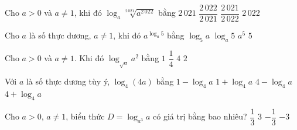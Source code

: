 

\begin{ex}%
	 Cho $a>0$ và $a\ne1$, khi đó $\log_{a}\sqrt[2\,021]{a^{2\,022}}$ bằng
	\choice 
		 {$2\,021$}
		{\True $\dfrac{2\,022}{2\,021}$} 
		 {$\dfrac{2\,021}{2\,022}$}
		{$2\,022$} 
\end{ex}

\begin{ex}%
	Cho $a$ là số thực dương, $a\ne 1$, khi đó $a^{\log_a5}$ bằng 
	\choice 
		{$\log_5a$} 
		{$\log_a5$} 
		{$a^5$} 
		{\True $5$} 
\end{ex}

\begin{ex}%
	Cho $a>0$ và $a\ne1$. Khi đó $\log_{\sqrt{a}}a^{2}$ bằng 
	\choice 
		 {$1$}
		 {$\dfrac{1}{4}$}
		 {\True $4$}
		 {$2$}
\end{ex}

\begin{ex}%
	Với $a$ là số thực dương tùy ý, $\log_{4}\left(4a\right)$  bằng
	 \choice
		{$1-\log_{4}a$} 
		{\True  $1+\log_{4}a$}
		{$4-\log_{4}a$} 
		 {$4+\log_{4}a$}
\end{ex}

\begin{ex}%
	Cho $a>0$, $a\ne1$, biểu thức $D=\log_{a^{3}}a$ có giá trị bằng bao  nhiêu?
	 \choice
		 {\True $\dfrac{1}{3}$}
		{$3$} 
		{$-\dfrac{1}{3}$} 
		 {$-3$}
\end{ex}

